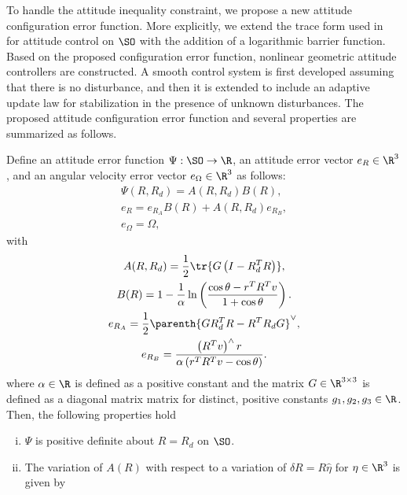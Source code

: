 To handle the attitude inequality constraint, we propose a new attitude configuration error function. 
More explicitly, we extend the trace form used in~\cite{bullo2004,LeeITCST13} for attitude control on \(\SO\) with the addition of a logarithmic barrier function. 
Based on the proposed configuration error function,  nonlinear geometric attitude controllers are constructed. 
A smooth control system is first developed assuming that there is  no disturbance, and then it is extended to include an adaptive update law for stabilization in the presence of unknown disturbances. 
The proposed attitude configuration error function and several properties are summarized as follows.

\begin{prop} \label{prop:config_error}
Define an attitude error function \( \Psi : \SO \to \R \), an attitude error vector \( e_R \in \R^3 \), and an angular velocity error vector \( e_\Omega \in \R^3 \) as follows:
\begin{gather}
	\Psi(R, R_d) = A(R, R_d) B(R) , \label{eqn:psi} \\
	e_R = e_{R_A} B(R) + A(R,R_d) e_{R_B} , \label{eqn:eR} \\
	e_\Omega = \Omega , \label{eqn:eW}
\end{gather}
with
\begin{gather}
	A(R,R_d) = \frac{1}{2} \tr{G \left( I - R_d^T R\right)} , \label{eqn:A} \\
	B(R) = 1 - \frac{1}{\alpha} \ln \left( \frac{\cos \theta -  r^T R^T v}{1 + \cos \theta}\right) . \label{eqn:B} \\
	e_{R_A} = \frac{1}{2} \parenth{G R_d^T R - R^T R_d G} ^ \vee , \label{eqn:eRA} \\
	e_{R_B} = \frac{ \left( R^T v\right)^\wedge r}{\alpha \left(r^T R^T v - \cos \theta \right)} . \label{eqn:eRB} 
\end{gather}	
where \( \alpha \in \R \) is defined as a positive constant and the matrix \( G \in \R^{3 \times 3} \) is defined as a diagonal matrix matrix for distinct, positive constants \( g_1, g_2, g_3 \in \R \).
Then, the following properties hold
\begin{enumerate}[(i)]
	\item \label{item:prop_psi_psd} \(\Psi\) is positive definite about \( R = R_d\) on $\SO$.
	\item \label{item:prop_era}The variation of \( A(R) \) with respect to a variation of \( \delta R = R \hat{\eta} \) for \( \eta \in \R^3 \) is given by

\end{enumerate}
\end{prop}
